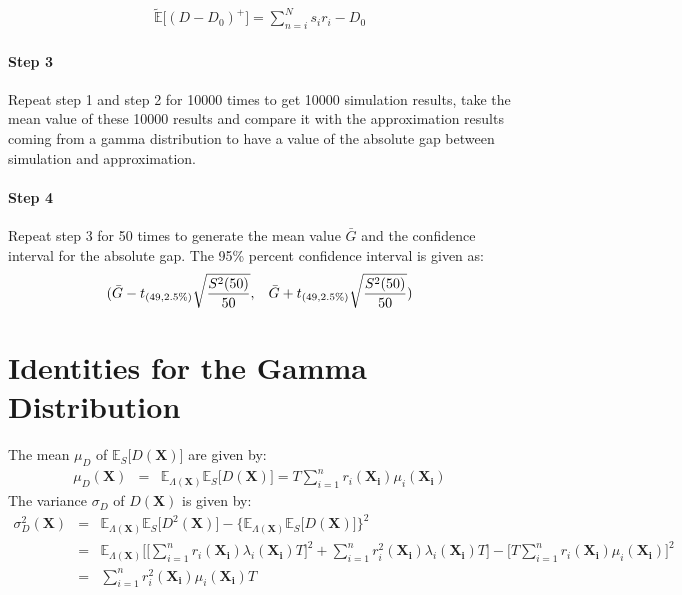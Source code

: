 \documentclass[preprint,12pt]{elsarticle}
\begin{document}
\begin{eqnarray}
\tilde{\mathbb{E}}\bigg[(D-D_0)^{+} \bigg] =\sum_{n=i}^{N}{s_{i}r_{i}}-D_0
\end{eqnarray}


\paragraph{Step 3}

Repeat step 1 and step 2 for 10000  times to get 10000 simulation results, take the mean value of these 10000 results and compare it with the approximation results coming from a gamma distribution to have a value of the absolute gap between simulation and approximation.


\paragraph{Step 4}
Repeat step 3 for 50 times to generate the mean value $\bar{G}$ and the confidence interval for the absolute gap. The 95\% percent confidence interval is given as:
$$(\bar{G}-t_{(49,2.5\%)}\sqrt{\frac{S^{2}(50)}{50}},\hspace{3mm}\bar{G}+t_{(49,2.5\%)}\sqrt{\frac{S^{2}(50)}{50}} ) $$
\section{Identities for the Gamma Distribution}
\label{AG}
The mean $\mu_{D}$ of $\mathbb{E}_{S}\bigg[D(\boldsymbol{X})\bigg]$ are given by:
\begin{eqnarray}
\mu_{D}(\boldsymbol{X})&=&\mathbb{E}_{\Lambda(\boldsymbol{X})}\mathbb{E}_{S} \bigg[D(\boldsymbol{X}) \bigg]=T\sum_{i=1}^{n}{r_{i}(\boldsymbol{X_i})\mu_{i}(\boldsymbol{X_i})}
\label{muD}
\end{eqnarray}
The variance $\sigma_{D}$ of $D(\boldsymbol{X})$ is given by:
\begin{eqnarray}
\sigma^{2}_{D}(\boldsymbol{X})&=&\mathbb{E}_{\Lambda(\boldsymbol{X})}\mathbb{E}_{S} \bigg[D^{2}(\boldsymbol{X}) \bigg]- \bigg\{\mathbb{E}_{\Lambda(\boldsymbol{X})}\mathbb{E}_{S}\bigg[D(\boldsymbol{X}) \bigg] \bigg\}^{2} \nonumber\\
&=& \mathbb{E}_{\Lambda(\boldsymbol{X})}\bigg[\bigg[\sum_{i=1}^{n}{r_{i}(\boldsymbol{X_{i}})\lambda_{i}(\boldsymbol{X_{i}})T}\bigg]^{2} +\sum_{i=1}^{n}{r_{i}^{2}(\boldsymbol{X_{i}})\lambda_{i}(\boldsymbol{X_{i}})T}\bigg]-\bigg[T\sum_{i=1}^{n}{r_{i}(\boldsymbol{X_i})\mu_{i}(\boldsymbol{X_i})}\bigg]^{2}\nonumber\\
&=&\sum_{i=1}^{n}{r_{i}^{2}(\boldsymbol{X_i})\mu_{i}(\boldsymbol{X_i})T}
\end{eqnarray}
\end{document}
